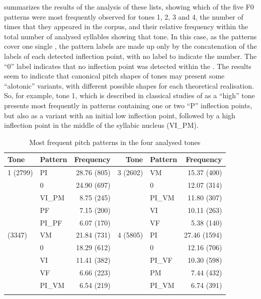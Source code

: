 \documentclass[output=paper]{langsci/langscibook}
\begin{document}
 summarizes the results of the analysis of these lists, showing which of the five F0 patterns were most frequently observed for tones 1, 2, 3 and 4, the number of times that they appeared in the corpus, and their relative frequency within the total number of analysed syllables showing that tone. In this case, as the patterns cover one single , the pattern labels are made up only by the concatenation of the labels of each detected inflection point, with no label to indicate the  number. The ``0'' label indicates that no inflection point was detected within the . The results seem to indicate that canonical pitch shapes of  tones may present some ``alotonic'' variants, with different possible shapes for each theoretical realisation. So, for example, tone 1, which is described in classical studies of   as a ``high'' tone \citep{Chao1922} presents most frequently in patterns containing one or two ``P'' inflection points, but also as a variant with an initial low inflection point, followed by a high inflection point in the middle of the syllabic nucleus (VI\_PM). 

\begin{table}
\footnotesize
\begin{tabularx}{\textwidth}{X lrr lr}
\lsptoprule
Tone & Pattern & Frequency & Tone & Pattern & Frequency\\
\midrule 
1 (2799) & PI & 28.76 (805) & 3 (2602) & VM & 15.37 (400) \\
& 0 & 24.90 (697) &  & 0 & 12.07 (314) \\
& VI\_PM & 8.75 (245) &  & PI\_VM & 11.80 (307) \\
& PF & 7.15 (200) &  & VI & 10.11 (263) \\
& PI\_PF & 6.07 (170) &  & VF & 5.38 (140) \\
\tablevspace
2 (3347) & VM & 21.84 (731) & 4 (5805) & PI & 27.46 (1594) \\
& 0 & 18.29 (612) &  & 0 & 12.16 (706) \\
& VI & 11.41 (382) &  & PI\_VF & 10.30 (598) \\
& VF & 6.66 (223) &  & PM & 7.44 (432) \\
& PI\_VM & 6.54 (219) &  & PI\_VM & 6.74 (391) \\ 
\lspbottomrule
\end{tabularx}
\caption{Most frequent pitch patterns in the four analysed tones \citep{Yao2015}}
\label{tab:gar:10}
\end{table}
\end{document}
